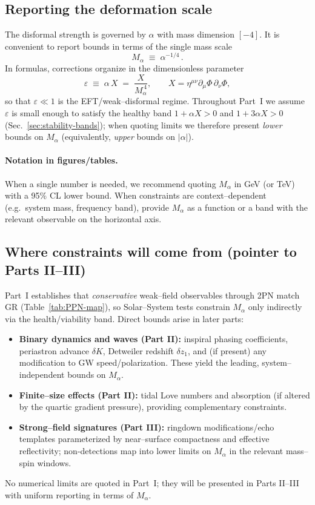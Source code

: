 \documentclass{article}
\begin{document}
\subsection{Reporting the deformation scale}
\label{subsec:reportMalpha}
The disformal strength is governed by $\alpha$ with mass dimension $[-4]$. It is convenient to report bounds in terms of the single mass scale
\begin{equation}
M_\alpha \;\equiv\; \alpha^{-1/4} \, .
\label{eq:Malpha}
\end{equation}
In formulas, corrections organize in the dimensionless parameter
\begin{equation}
\varepsilon \;\equiv\; \alpha\,X \;=\; \frac{X}{M_\alpha^{\,4}},
\qquad
X=\eta^{\mu\nu}\partial_\mu\Phi\,\partial_\nu\Phi,
\label{eq:eps-def}
\end{equation}
so that $\varepsilon\ll 1$ is the EFT/weak–disformal regime. Throughout Part~I we assume $\varepsilon$ is small enough to satisfy the healthy band $1+\alpha X>0$ and $1+3\alpha X>0$ (Sec.~\ref{sec:stability-bands}); when quoting limits we therefore present \emph{lower} bounds on $M_\alpha$ (equivalently, \emph{upper} bounds on $|\alpha|$).

\paragraph{Notation in figures/tables.} When a single number is needed, we recommend quoting $M_\alpha$ in GeV (or TeV) with a 95\% CL lower bound. When constraints are context–dependent (e.g.\ system mass, frequency band), provide $M_\alpha$ as a function or a band with the relevant observable on the horizontal axis.

\subsection{Where constraints will come from (pointer to Parts II–III)}
\label{subsec:constraints-outlook}
Part~I establishes that \emph{conservative} weak–field observables through 2PN match GR (Table~\ref{tab:PPN-map}), so Solar–System tests constrain $M_\alpha$ only indirectly via the health/viability band. Direct bounds arise in later parts:
\begin{itemize}
\item \textbf{Binary dynamics and waves (Part II):} inspiral phasing coefficients, periastron advance $\delta K$, Detweiler redshift $\delta z_1$, and (if present) any modification to GW speed/polarization. These yield the leading, system–independent bounds on $M_\alpha$.
\item \textbf{Finite–size effects (Part II):} tidal Love numbers and absorption (if altered by the quartic gradient pressure), providing complementary constraints.
\item \textbf{Strong–field signatures (Part III):} ringdown modifications/echo templates parameterized by near–surface compactness and effective reflectivity; non-detections map into lower limits on $M_\alpha$ in the relevant mass–spin windows.
\end{itemize}
No numerical limits are quoted in Part~I; they will be presented in Parts II–III with uniform reporting in terms of $M_\alpha$.
\end{document}
